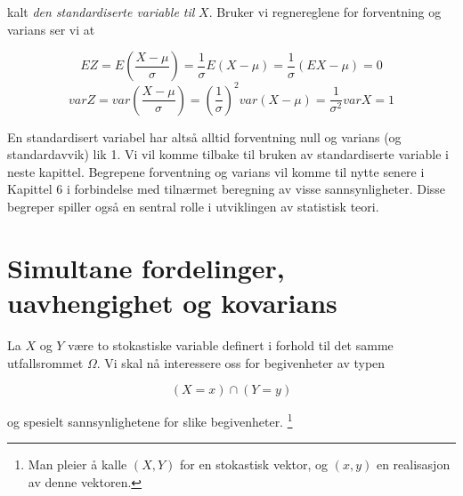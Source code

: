 \noindent kalt {\em den standardiserte variable til} $X$. Bruker vi
regnereglene for forventning og varians ser vi at

\[ EZ=E(\frac{X-\mu}{\sigma})=\frac{1}{\sigma}E(X-\mu)=
                                \frac{1}{\sigma}(EX-\mu)=0\]
\[  varZ=var(\frac{X-\mu}{\sigma})={(\frac{1}{\sigma})}^2var(X-\mu)
                =\frac{1}{{\sigma}^2}varX=1  \]

\noindent En standardisert variabel har altså alltid forventning null og
varians (og standardavvik) lik 1. Vi vil komme tilbake til bruken
av standardiserte variable i neste kapittel.
Begrepene forventning og varians vil komme til nytte senere i
Kapittel 6 i forbindelse med tilnærmet beregning av visse
sannsynligheter. Disse begreper spiller også en sentral rolle i
utviklingen av statistisk teori.



\section{Simultane fordelinger, uavhengighet og kovarians}

La $X$ og $Y$ være to stokastiske variable definert i forhold til
det samme utfallsrommet $\Omega$. Vi skal nå interessere oss for
begivenheter av typen

\[            (X=x)\cap (Y=y) \]

\noindent og spesielt sannsynlighetene for slike begivenheter.
     \footnote{Man pleier å kalle $(X,Y)$ for en
     stokastisk vektor, og $(x,y)$ en realisasjon av denne vektoren.}

\begin{center}  \end{center}

